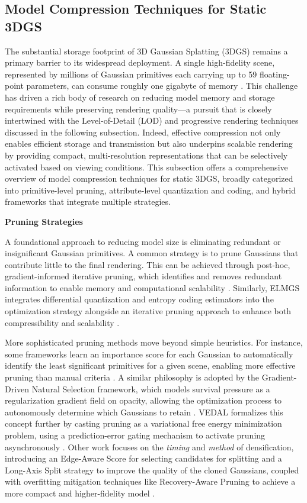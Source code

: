 \documentclass[11pt]{article}
\begin{document}
\subsection{Model Compression Techniques for Static 3DGS}

The substantial storage footprint of 3D Gaussian Splatting (3DGS) remains a primary barrier to its widespread deployment. A single high-fidelity scene, represented by millions of Gaussian primitives each carrying up to 59 floating-point parameters, can consume roughly one gigabyte of memory \cite{ref427,ref98}. This challenge has driven a rich body of research on reducing model memory and storage requirements while preserving rendering quality---a pursuit that is closely intertwined with the Level-of-Detail (LOD) and progressive rendering techniques discussed in the following subsection. Indeed, effective compression not only enables efficient storage and transmission but also underpins scalable rendering by providing compact, multi-resolution representations that can be selectively activated based on viewing conditions. This subsection offers a comprehensive overview of model compression techniques for static 3DGS, broadly categorized into primitive-level pruning, attribute-level quantization and coding, and hybrid frameworks that integrate multiple strategies.

\textbf{Pruning Strategies}

A foundational approach to reducing model size is eliminating redundant or insignificant Gaussian primitives. A common strategy is to prune Gaussians that contribute little to the final rendering. This can be achieved through post-hoc, gradient-informed iterative pruning, which identifies and removes redundant information to enable memory and computational scalability \cite{ref428}. Similarly, ELMGS integrates differential quantization and entropy coding estimators into the optimization strategy alongside an iterative pruning approach to enhance both compressibility and scalability \cite{ref429}.

More sophisticated pruning methods move beyond simple heuristics. For instance, some frameworks learn an importance score for each Gaussian to automatically identify the least significant primitives for a given scene, enabling more effective pruning than manual criteria \cite{ref430}. A similar philosophy is adopted by the Gradient-Driven Natural Selection framework, which models survival pressure as a regularization gradient field on opacity, allowing the optimization process to autonomously determine which Gaussians to retain \cite{ref131}. VEDAL formalizes this concept further by casting pruning as a variational free energy minimization problem, using a prediction-error gating mechanism to activate pruning asynchronously \cite{ref132}. Other work focuses on the \emph{timing} and \emph{method} of densification, introducing an Edge-Aware Score for selecting candidates for splitting and a Long-Axis Split strategy to improve the quality of the cloned Gaussians, coupled with overfitting mitigation techniques like Recovery-Aware Pruning to achieve a more compact and higher-fidelity model \cite{ref42}.
\end{document}
